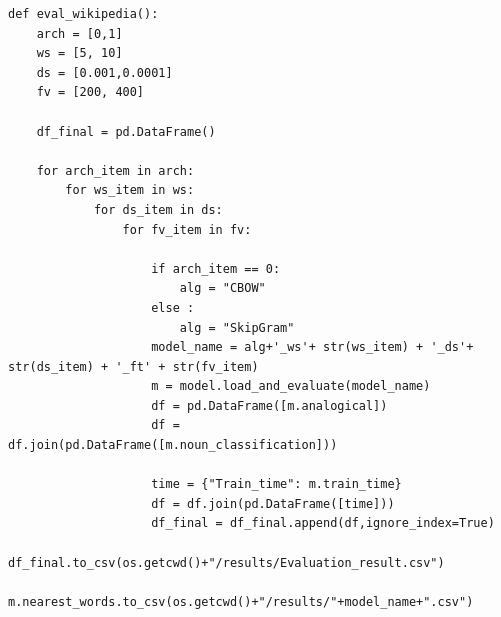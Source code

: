 \documentclass[12pt]{report}
\begin{document}
\begin{lstlisting}
def eval_wikipedia():	
	arch = [0,1] 
	ws = [5, 10] 
	ds = [0.001,0.0001]
	fv = [200, 400]

	df_final = pd.DataFrame()

	for arch_item in arch:
		for ws_item in ws:
			for ds_item in ds:
				for fv_item in fv:

					if arch_item == 0:
						alg = "CBOW"
					else :
						alg = "SkipGram"
					model_name = alg+'_ws'+ str(ws_item) + '_ds'+ str(ds_item) + '_ft' + str(fv_item)
					m = model.load_and_evaluate(model_name) 
					df = pd.DataFrame([m.analogical])
					df = df.join(pd.DataFrame([m.noun_classification]))

					time = {"Train_time": m.train_time}
					df = df.join(pd.DataFrame([time]))
					df_final = df_final.append(df,ignore_index=True)
					df_final.to_csv(os.getcwd()+"/results/Evaluation_result.csv")
					m.nearest_words.to_csv(os.getcwd()+"/results/"+model_name+".csv")




\end{lstlisting}
\end{document}
